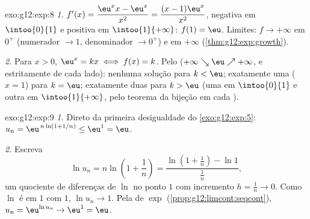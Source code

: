 \begin{solution}{exo:g12:exp:8}
\emph{1.} $f'(x) = \dfrac{\eu^x x - \eu^x}{x^2} =
\dfrac{(x-1)\eu^x}{x^2}$, negativa em $\intoo{0}{1}$ e positiva em
$\intoo{1}{+\infty}$:  $f(1) = \eu$. Limites: $f \to +\infty$ em
$0^+$ (numerador $\to 1$, denominador $\to 0^+$) e em $+\infty$
(\cref{thm:g12:exp:growth}).

\emph{2.} Para $x > 0$, $\eu^x = kx \iff f(x) = k$. Pelo  ($+\infty \searrow \eu \nearrow +\infty$,  e
estritamente  de cada lado): nenhuma solução para $k < \eu$;
exatamente uma ($x = 1$) para $k = \eu$; exatamente duas para $k > \eu$
(uma em $\intoo{0}{1}$ e outra em $\intoo{1}{+\infty}$, pelo teorema da
bijeção em cada ).
\end{solution}

\begin{solution}{exo:g12:exp:9}
\emph{1.} Direto da primeira desigualdade do \cref{exo:g12:exp:5}:
$u_n = \eu^{\,n\ln(1+1/n)} \leq \eu^1 = \eu$.

\emph{2.} Escreva
\[
\ln u_n = n \ln\!\left(1 + \frac1n\right)
= \frac{\ln\!\left(1 + \frac1n\right) - \ln 1}{\frac1n},
\]
um quociente de diferenças de $\ln$ no ponto $1$ com incremento
$h = \frac1n \to 0$. Como $\ln$ é  em $1$ com  $1$,
$\ln u_n \to 1$. Pela  de $\exp$
(\cref{prop:g12:limcont:seqcont}), $u_n = \eu^{\ln u_n} \to \eu^1 = \eu$.
\end{solution}

